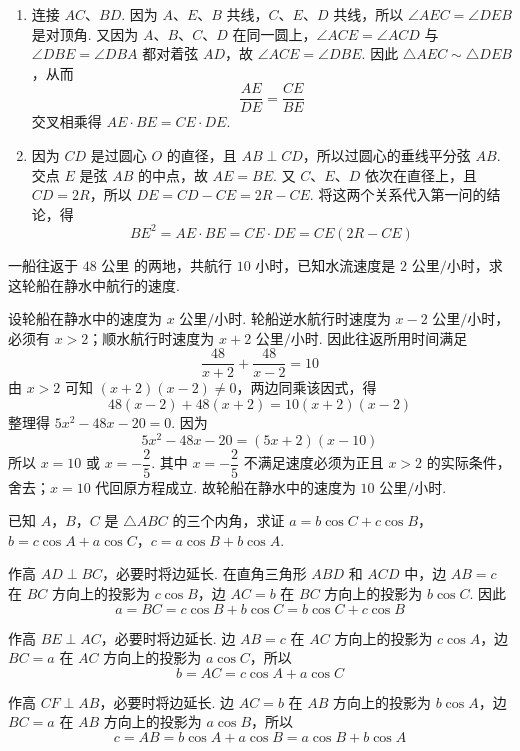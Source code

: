 \begin{solution}
\begin{enumerate}
\item 连接 \(AC\)、\(BD\). 因为 \(A\)、\(E\)、\(B\) 共线，\(C\)、\(E\)、\(D\) 共线，所以 \(\angle AEC=\angle DEB\) 是对顶角. 又因为 \(A\)、\(B\)、\(C\)、\(D\) 在同一圆上，\(\angle ACE=\angle ACD\) 与 \(\angle DBE=\angle DBA\) 都对着弦 \(AD\)，故 \(\angle ACE=\angle DBE\). 因此 \(\triangle AEC\sim\triangle DEB\)，从而
\[
\dfrac{AE}{DE}=\dfrac{CE}{BE}
\]
交叉相乘得 \(AE\cdot BE=CE\cdot DE\).

\item 因为 \(CD\) 是过圆心 \(O\) 的直径，且 \(AB\perp CD\)，所以过圆心的垂线平分弦 \(AB\). 交点 \(E\) 是弦 \(AB\) 的中点，故 \(AE=BE\). 又 \(C\)、\(E\)、\(D\) 依次在直径上，且 \(CD=2R\)，所以 \(DE=CD-CE=2R-CE\). 将这两个关系代入第一问的结论，得
\[
BE^2=AE\cdot BE=CE\cdot DE=CE(2R-CE)
\]
\end{enumerate}
\end{solution}

\begin{problem}
一船往返于 \(48\text{ 公里}\) 的两地，共航行 \(10\text{ 小时}\)，已知水流速度是 \(2\text{ 公里/小时}\)，求这轮船在静水中航行的速度.
\end{problem}

\begin{solution}
设轮船在静水中的速度为 \(x\text{ 公里/小时}\). 轮船逆水航行时速度为 \(x-2\text{ 公里/小时}\)，必须有 \(x>2\)；顺水航行时速度为 \(x+2\text{ 公里/小时}\). 因此往返所用时间满足
\[
\dfrac{48}{x+2}+\dfrac{48}{x-2}=10
\]
由 \(x>2\) 可知 \((x+2)(x-2)\ne0\)，两边同乘该因式，得
\[
48(x-2)+48(x+2)=10(x+2)(x-2)
\]
整理得 \(5x^2-48x-20=0\). 因为
\[
5x^2-48x-20=(5x+2)(x-10)
\]
所以 \(x=10\) 或 \(x=-\dfrac25\). 其中 \(x=-\dfrac25\) 不满足速度必须为正且 \(x>2\) 的实际条件，舍去；\(x=10\) 代回原方程成立. 故轮船在静水中的速度为 \(10\text{ 公里/小时}\).
\end{solution}

\begin{problem}
已知 \(A\)，\(B\)，\(C\) 是 \(\triangle ABC\) 的三个内角，求证 \(a=b\cos C+c\cos B\)，\(b=c\cos A+a\cos C\)，\(c=a\cos B+b\cos A\).

\end{problem}

\begin{solution}
作高 \(AD\perp BC\)，必要时将边延长. 在直角三角形 \(ABD\) 和 \(ACD\) 中，边 \(AB=c\) 在 \(BC\) 方向上的投影为 \(c\cos B\)，边 \(AC=b\) 在 \(BC\) 方向上的投影为 \(b\cos C\). 因此
\[
a=BC=c\cos B+b\cos C=b\cos C+c\cos B
\]

作高 \(BE\perp AC\)，必要时将边延长. 边 \(AB=c\) 在 \(AC\) 方向上的投影为 \(c\cos A\)，边 \(BC=a\) 在 \(AC\) 方向上的投影为 \(a\cos C\)，所以
\[
b=AC=c\cos A+a\cos C
\]

作高 \(CF\perp AB\)，必要时将边延长. 边 \(AC=b\) 在 \(AB\) 方向上的投影为 \(b\cos A\)，边 \(BC=a\) 在 \(AB\) 方向上的投影为 \(a\cos B\)，所以
\[
c=AB=b\cos A+a\cos B=a\cos B+b\cos A
\]
\end{solution}


